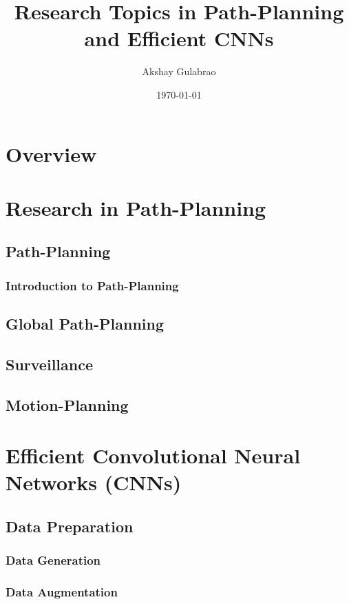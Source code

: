 \documentclass[12pt]{article}
\title{Research Topics in Path-Planning and Efficient CNNs}
\author{Akshay Gulabrao}
\date{\today}
\begin{document}
\maketitle
\section{Overview}

\section{Research in Path-Planning}
\subsection{Path-Planning}
\subsubsection{Introduction to Path-Planning}


\subsection{Global Path-Planning}

\subsection{Surveillance}

\subsection{Motion-Planning}

\section{Efficient Convolutional Neural Networks (CNNs)}
\subsection{Data Preparation}
\subsubsection{Data Generation}

\subsubsection{Data Augmentation}
\end{document}
